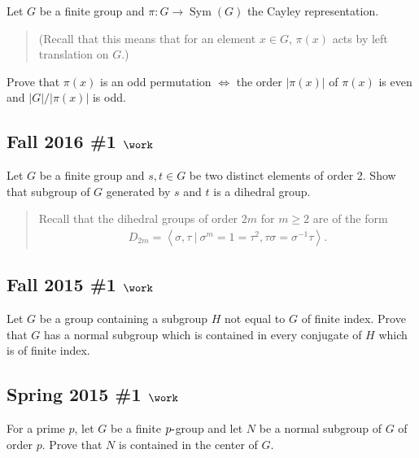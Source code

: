 Let \(G\) be a finite group and \(\pi: G\to \operatorname{Sym}(G)\) the
Cayley representation.

\begin{quote}
(Recall that this means that for an element \(x\in G\), \(\pi(x)\) acts
by left translation on \(G\).)
\end{quote}

Prove that \(\pi(x)\) is an odd permutation \(\iff\) the order
\({\left\lvert {\pi(x)} \right\rvert}\) of \(\pi(x)\) is even and
\({\left\lvert {G} \right\rvert} / {\left\lvert {\pi(x)} \right\rvert}\)
is odd.

\hypertarget{fall-2016-1-work}{%
\subsection{\texorpdfstring{Fall 2016 \#1
\(\work\)}{Fall 2016 \#1 \textbackslash work}}\label{fall-2016-1-work}}

Let \(G\) be a finite group and \(s, t\in G\) be two distinct elements
of order 2. Show that subgroup of \(G\) generated by \(s\) and \(t\) is
a dihedral group.

\begin{quote}
Recall that the dihedral groups of order \(2m\) for \(m\geq 2\) are of
the form
\begin{align*}
D_{2m} = \left\langle{\sigma, \tau {~\mathrel{\Big|}~}\sigma^m = 1 = \tau^2, \tau \sigma = \sigma^{-1}\tau}\right\rangle
.\end{align*}
\end{quote}

\hypertarget{fall-2015-1-work}{%
\subsection{\texorpdfstring{Fall 2015 \#1
\(\work\)}{Fall 2015 \#1 \textbackslash work}}\label{fall-2015-1-work}}

Let \(G\) be a group containing a subgroup \(H\) not equal to \(G\) of
finite index. Prove that \(G\) has a normal subgroup which is contained
in every conjugate of \(H\) which is of finite index.

\hypertarget{spring-2015-1-work}{%
\subsection{\texorpdfstring{Spring 2015 \#1
\(\work\)}{Spring 2015 \#1 \textbackslash work}}\label{spring-2015-1-work}}

For a prime \(p\), let \(G\) be a finite \(p{\hbox{-}}\)group and let
\(N\) be a normal subgroup of \(G\) of order \(p\). Prove that \(N\) is
contained in the center of \(G\).

